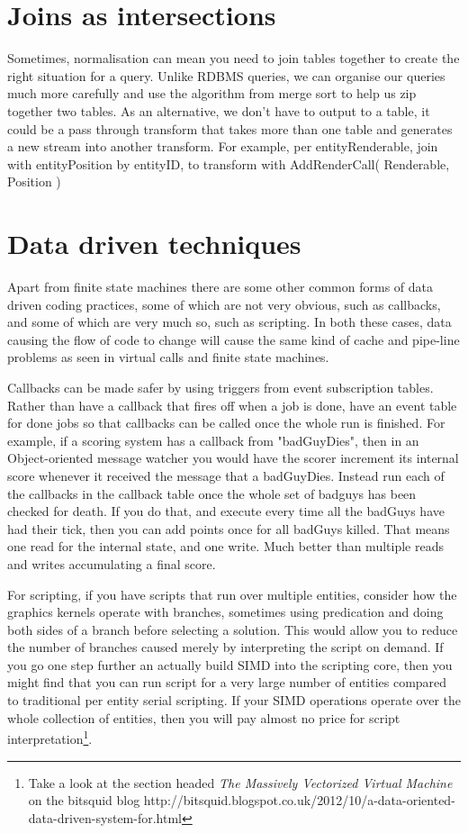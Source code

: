 \section{Joins as intersections}

Sometimes, normalisation can mean you need to join tables together to create
the right situation for a query. Unlike RDBMS queries, we can organise our
queries much more carefully and use the algorithm from merge sort to help us
zip together two tables. As an alternative, we don't have to output to a table,
it could be a pass through transform that takes more than one table and
generates a new stream into another transform. For example, per
entityRenderable, join with entityPosition by entityID, to transform with
AddRenderCall( Renderable, Position )

\section{Data driven techniques}

Apart from finite state machines there are some other common forms of data
driven coding practices, some of which are not very obvious, such as callbacks,
and some of which are very much so, such as scripting. In both these cases,
data causing the flow of code to change will cause the same kind of cache and
pipe-line problems as seen in virtual calls and finite state machines.

Callbacks can be made safer by using triggers from event subscription tables.
Rather than have a callback that fires off when a job is done, have an event
table for done jobs so that callbacks can be called once the whole run is
finished. For example, if a scoring system has a callback from "badGuyDies",
then in an Object-oriented message watcher you would have the scorer increment
its internal score whenever it received the message that a badGuyDies. Instead
run each of the callbacks in the callback table once the whole set of badguys
has been checked for death. If you do that, and execute every time all the
badGuys have had their tick, then you can add points once for all badGuys
killed. That means one read for the internal state, and one write. Much better
than multiple reads and writes accumulating a final score.

For scripting, if you have scripts that run over multiple entities, consider
how the graphics kernels operate with branches, sometimes using predication and
doing both sides of a branch before selecting a solution. This would allow you
to reduce the number of branches caused merely by interpreting the script on
demand.  If you go one step further an actually build SIMD into the scripting
core, then you might find that you can run script for a very large number of
entities compared to traditional per entity serial scripting. If your SIMD
operations operate over the whole collection of entities, then you will pay
almost no price for script interpretation\footnote{Take a look at the section
headed \emph{The Massively Vectorized Virtual Machine} on the bitsquid blog
http://bitsquid.blogspot.co.uk/2012/10/a-data-oriented-data-driven-system-for.html}.
